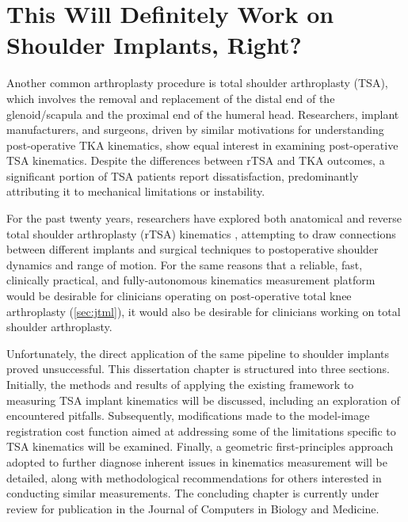 \chapter{This Will Definitely Work on Shoulder Implants, Right?}{\renewcommand*{\thefootnote}{\fnsymbol{footnote}}

Another common arthroplasty procedure is total shoulder arthroplasty (TSA), which involves the removal and replacement of the distal end of the glenoid/scapula and the proximal end of the humeral head.
Researchers, implant manufacturers, and surgeons, driven by similar motivations for understanding post-operative TKA kinematics, show equal interest in examining post-operative TSA kinematics.
Despite the differences between rTSA and TKA outcomes, a significant portion of TSA patients report dissatisfaction, predominantly attributing it to mechanical limitations or instability.

For the past twenty years, researchers have explored both anatomical and reverse total shoulder arthroplasty (rTSA) kinematics \cite{kijimaVivo3dimensionalAnalysis2015,matsukiVivo3DAnalysis2014,matsukiDynamicVivoGlenohumeral2012,sugiComparingVivoThreedimensional2021,burtonFullyAutomaticTracking2023}, attempting to draw connections between different implants and surgical techniques to postoperative shoulder dynamics and range of motion.
For the same reasons that a reliable, fast, clinically practical, and fully-autonomous kinematics measurement platform would be desirable for clinicians operating on post-operative total knee arthroplasty (\cref{sec:jtml}), it would also be desirable for clinicians working on total shoulder arthroplasty.

Unfortunately, the direct application of the same pipeline to shoulder implants proved unsuccessful.
This dissertation chapter is structured into three sections. Initially, the methods and results of applying the existing framework to measuring TSA implant kinematics will be discussed, including an exploration of encountered pitfalls.
Subsequently, modifications made to the model-image registration cost function aimed at addressing some of the limitations specific to TSA kinematics will be examined.
Finally, a geometric first-principles approach adopted to further diagnose inherent issues in kinematics measurement will be detailed, along with methodological recommendations for others interested in conducting similar measurements.
The concluding chapter is currently under review for publication in the Journal of Computers in Biology and Medicine.

}

